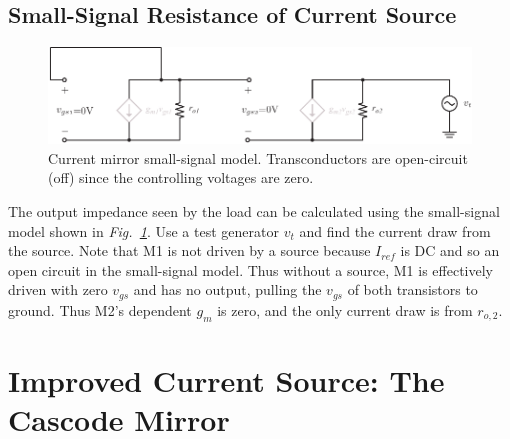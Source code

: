\subsection{Small-Signal Resistance of Current Source}
\begin{figure}[tb]
\centering
\includegraphics[scale=0.95]{8mirror_small_signal.pdf}
\caption{Current mirror small-signal model.  Transconductors are open-circuit (off) since the controlling voltages are zero.}
\label{fig:8mirror_small_signal.pdf}
\end{figure}
The output impedance seen by the load can be calculated using the small-signal model shown in \emph{Fig.~\ref{fig:8mirror_small_signal.pdf}}.  Use a test generator $v_t$ and find the current draw from the source.  Note that M1 is not driven by a source because $I_{ref}$ is DC and so an open circuit in the small-signal model.  Thus without a source, M1 is effectively driven with zero $v_{gs}$ and has no output, pulling the $v_{gs}$ of both transistors to ground.  Thus M2's dependent $g_m$ is zero, and the only current draw is from $r_{o,2}$.
\newpage
\section{Improved Current Source:  The Cascode Mirror}

